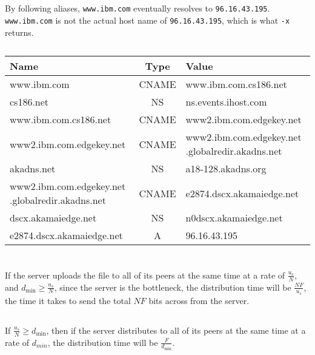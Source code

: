 \documentclass[12pt]{article}
\begin{document}
\section{}
\subsection{}
By following aliases, \texttt{www.ibm.com} eventually resolves to
\texttt{96.16.43.195}.  \texttt{www.ibm.com} is not the actual host name of
\texttt{96.16.43.195}, which is what \texttt{-x} returns.
\subsection{}

\begin{tabular}{|p{5cm}|c|p{5cm}|}
    \hline
    \textbf{Name} & \textbf{Type} & \textbf{Value}\\
    \hline
    www.ibm.com & CNAME & www.ibm.com.cs186.net\\
    cs186.net & NS & ns.events.ihost.com\\
    www.ibm.com.cs186.net & CNAME & www2.ibm.com.edgekey.net\\
    www2.ibm.com.edgekey.net & CNAME & www2.ibm.com.edgekey.net .globalredir.akadns.net \\
    akadns.net & NS & a18-128.akadns.org\\
    www2.ibm.com.edgekey.net .globalredir.akadns.net & CNAME & e2874.dscx.akamaiedge.net\\
    dscx.akamaiedge.net & NS & n0dscx.akamaiedge.net\\
    e2874.dscx.akamaiedge.net & A & 96.16.43.195\\
    \hline
\end{tabular}

\section{}
\subsection{}

If the server uploads the file to all of its peers at the same time at a rate of
$\frac{u_s}{N}$, and $d_{\text{min}} \geq \frac{u_s}{N}$, since the server is
the bottleneck, the distribution time will be $\frac{NF}{u_s}$, the time it takes
to send the total $NF$ bits across from the server.

\subsection{}
If $\frac{u_s}{N} \geq d_{\text{min}}$, then if the server distributes to all of
its peers at the same time at a rate of $d_{min}$, the distribution time will be
$\frac{F}{d_\text{min}}$.
\end{document}
